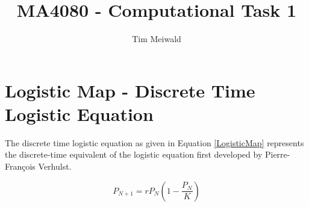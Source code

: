 \documentclass[11pt,a4paper]{CLabBookTemplate} %
\author{Tim Meiwald}
\title{MA4080 - Computational Task 1 } %
\begin{document}
\setcounter{page}{1} %

\maketitle %




\thispagestyle{fancy} %
\mytableofcontents
\newpage %


\setcounter{page}{1} %

\section{Logistic Map - Discrete Time Logistic Equation}

The discrete time logistic equation  as given in Equation \ref{LogisticMap} represents the discrete-time equivalent of the logistic equation first developed by Pierre-Fran\c cois Verhulst. \par 

\begin{equation}
\label{LogisticMap}
P_{N+1} = rP_{N}\left(1 - \frac{P_{N}}{K}\right)
\end{equation}
\end{document}
